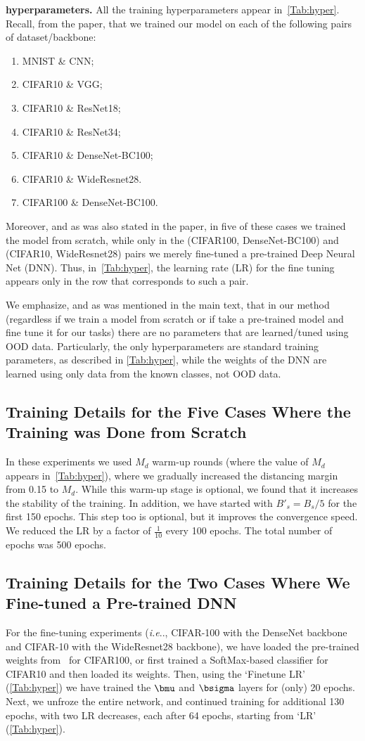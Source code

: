 \documentclass[accepted]{uai2022} %
\makeatletter
\DeclareRobustCommand\onedot{\futurelet\@let@token\@onedot}
\def\@onedot{\ifx\@let@token.\else.\null\fi\xspace}
\def\ie{\emph{i.e}\onedot} \def\Ie{\emph{I.e}\onedot}
\makeatother
\begin{document}
\textbf{hyperparameters.}
All the training hyperparameters appear in~\autoref{Tab:hyper}.
Recall, from the paper, that we trained our model 
on each of the following pairs of dataset/backbone:
\begin{enumerate}
 \item MNIST \& CNN;
 \item CIFAR10 \& VGG;
 \item CIFAR10 \& ResNet18;
 \item CIFAR10 \& ResNet34;
  \item CIFAR10 \& DenseNet-BC100;
 \item CIFAR10 \& WideResnet28.
 \item CIFAR100 \& DenseNet-BC100. 
\end{enumerate}
Moreover, and as was also stated in the paper, in five of these cases
we trained the model from scratch, while only in the (CIFAR100, DenseNet-BC100) and (CIFAR10, WideResnet28)
pairs we merely fine-tuned a pre-trained Deep Neural Net (DNN).
Thus, in~\autoref{Tab:hyper}, the learning rate (LR) for the fine tuning
appears only in the row that corresponds to such a pair. 

We emphasize, and as was mentioned in the main text, that in our method (regardless if we train a model from scratch or if take a pre-trained model
and fine tune it for our tasks) there are no parameters that are learned/tuned 
using OOD data. 
Particularly, the only hyperparameters are standard training parameters, as described in \autoref{Tab:hyper}, while the weights of the DNN are learned using only 
data from the known classes, not OOD data. 
\subsection{Training Details for the Five Cases Where the Training was Done from Scratch}
In these experiments we used $M_d$ warm-up rounds (where the value of $M_d$ appears in~\autoref{Tab:hyper}),
where we gradually increased the distancing margin from 0.15 to $M_d$. 
While this warm-up stage is optional, we found that it increases the stability of the training. In addition,
we have started with $B'_s = B_s/5$ for the first 150 epochs. This step too is optional, but it improves the convergence speed. We reduced the LR by a factor of $\frac{1}{10}$ every 100 epochs. The total number of epochs was 500 epochs.
\subsection{Training Details for the Two Cases Where We Fine-tuned a Pre-trained DNN} 
For the fine-tuning experiments (\ie, CIFAR-100 with the DenseNet backbone and CIFAR-10 with the WideResnet28 backbone),
we have loaded the pre-trained weights from~\citep{Liang:ICLR:2018:ODIN} for CIFAR100, or first trained a SoftMax-based classifier for CIFAR10 and then loaded its weights.
Then, using the `Finetune LR' (\autoref{Tab:hyper}) we have trained the $\bmu$ and $\bsigma$ layers for (only) 20 epochs. Next, we unfroze the entire network, and continued training for additional 130 epochs,
with two LR decreases, each after 64 epochs, starting from `LR' (\autoref{Tab:hyper}).\\
\end{document}
